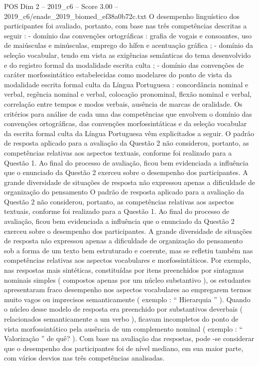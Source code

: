\begin{textsample}{POS Dim 2 – 2019\_c6 – Score 3.00 – 2019\_c6/enade\_2019\_biomed\_ef38a0b72c.txt}
O desempenho linguístico dos participantes foi avaliado, portanto, com base nas três competências descritas a seguir : - domínio das convenções ortográficas : grafia de vogais e consoantes, uso de maiúsculas e minúsculas, emprego do hífen e acentuação gráfica ; - domínio da seleção vocabular, tendo em vista as exigências semânticas do tema desenvolvido e do registro formal da modalidade escrita culta ; - domínio das convenções de caráter morfossintático estabelecidas como modelares do ponto de vista da modalidade escrita formal culta da Língua Portuguesa : concordância nominal e verbal, regência nominal e verbal, colocação pronominal, flexão nominal e verbal, correlação entre tempos e modos verbais, ausência de marcas de oralidade.
Os critérios para análise de cada uma das competências que envolvem o domínio das convenções ortográficas, das convenções morfossintáticas e da seleção vocabular da escrita formal culta da Língua Portuguesa vêm explicitados a seguir.
O padrão de resposta aplicado para a avaliação da Questão 2 não considerou, portanto, as competências relativas aos aspectos textuais, conforme foi realizado para a Questão 1.
Ao final do processo de avaliação, ficou bem evidenciada a influência que o enunciado da Questão 2 exerceu sobre o desempenho dos participantes.
A grande diversidade de situações de resposta não expressou apenas a dificuldade de organização do pensamento O padrão de resposta aplicado para a avaliação da Questão 2 não considerou, portanto, as competências relativas aos aspectos textuais, conforme foi realizado para a Questão 1.
Ao final do processo de avaliação, ficou bem evidenciada a influência que o enunciado da Questão 2 exerceu sobre o desempenho dos participantes.
A grande diversidade de situações de resposta não expressou apenas a dificuldade de organização do pensamento sob a forma de um texto bem estruturado e coerente, mas se refletiu também nas competências relativas aos aspectos vocabulares e morfossintáticos.
Por exemplo, nas respostas mais sintéticas, constituídas por itens preenchidos por sintagmas nominais simples ( compostos apenas por um núcleo substantivo ), os estudantes apresentaram fraco desempenho nos aspectos vocabulares ao empregarem termos muito vagos ou imprecisos semanticamente ( exemplo : “ Hierarquia ” ).
Quando o núcleo desse modelo de resposta era preenchido por substantivos deverbais ( relacionados semanticamente a um verbo ), ficavam incompletos do ponto de vista morfossintático pela ausência de um complemento nominal ( exemplo : “ Valorização ” de quê? ).
Com base na avaliação das respostas, pode -se considerar que o desempenho dos participantes foi de nível mediano, em sua maior parte, com vários desvios nas três competências analisadas.

\end{textsample}
